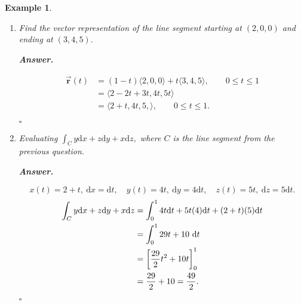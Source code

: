 \documentclass[12pt,a4paper]{article}
\newtheorem{eg}{Example}[subsection]
\newenvironment*{ans}{\par\indent\textbf{\textit{Answer. }}\par}{\par\hfill{$\square$}\par}
\def\dsst{\displaystyle}
\def\d{{\mathrm{d}}}
\def\dx{\d x}
\def\dy{\d y}
\def\dz{\d z}
\def\dt{\d t}
\def\intC{\dsst\int_C}
\def\vecr{\vec{\boldsymbol{\textbf{r}}}}
\begin{document}
\begin{eg}
\begin{enumerate}
	\item Find the vector representation of the line segment starting at $(2,0,0)$ and ending at $(3,4,5).$
	\begin{ans}
		\[\begin{aligned}\vecr(t)&=(1-t)\langle2,0,0\rangle+t\langle3,4,5\rangle,\qquad0\leq t\leq1\\&=\langle2-2t+3t,4t,5t\rangle\\&=\langle2+t,4t,5,\rangle,\qquad0\leq t\leq1.\end{aligned}\]
	\end{ans}
	\item Evaluating $\intC y\dx+z\dy+x\dz,$ where $C$ is the line segment from the previous question.
	\begin{ans}
		\[x(t)=2+t,\ \dx=\dt,\quad y(t)=4t,\ \dy=4\dt,\quad z(t)=5t,\ \dz=5\dt.\] \[\begin{aligned}\intC y\dx+z\dy+x\dz&=\int_0^14t\dt+5t(4)\dt+(2+t)(5)\dt\\&=\int_0^129t+10\ \dt\\&=\qty[\dfrac{29}{2}t^2+10t]_0^1\\&=\dfrac{29}{2}+10=\dfrac{49}{2}.\end{aligned}\]
	\end{ans}
\end{enumerate}	
\end{eg}
\end{document}

